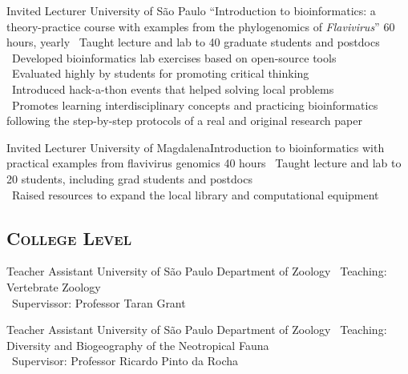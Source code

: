 \documentclass[11pt, letterpaper, sans]{moderncv}
\begin{document}
\vspace{.5em}

	{Invited Lecturer}
	{University of São Paulo}
	{``Introduction to bioinformatics: a theory-practice course with examples from the phylogenomics of \emph{Flavivirus}''}
	{60 hours, yearly}
	{
		\textbullet~Taught lecture and lab to 40 graduate students and postdocs\\
		\textbullet~Developed bioinformatics lab exercises based on open-source tools\\
		\textbullet~Evaluated highly by students for promoting critical thinking\\
		\textbullet~Introduced hack-a-thon events that helped solving local problems\\
		\textbullet~Promotes learning interdisciplinary concepts and practicing bioinformatics following the step-by-step protocols of a real and original research paper
	}

\vspace{.5em}

	{Invited Lecturer}
	{University of Magdalena}{Introduction to bioinformatics with practical examples from flavivirus genomics}
	{40 hours}
	{
		\textbullet~Taught lecture and lab to 20 students, including grad students and postdocs\\
		\textbullet~Raised resources to expand the local library and computational equipment
	}

	\subsection{\textsc{College Level}}
\vspace{.5em}

	{Teacher Assistant}
	{University of São Paulo}
	{Department of Zoology}
	{}
	{
		\textbullet~Teaching: Vertebrate Zoology\\
		\textbullet~Supervissor: Professor Taran Grant
	}

\vspace{.5em}

	{Teacher Assistant}
	{University of São Paulo}
	{Department of Zoology}
	{}
	{\textbullet~Teaching: Diversity and Biogeography of the Neotropical Fauna\\\textbullet~Supervisor: Professor Ricardo Pinto da Rocha
	}

\vspace{.5em}
\end{document}
